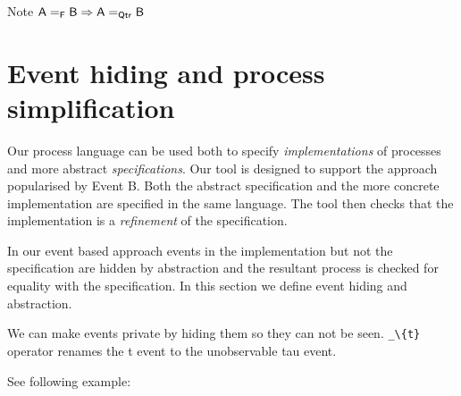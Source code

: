 \documentclass[]{article}
\begin{document}
Note $ \sf A=_F B \Rightarrow A=_{Qtr} B$

\section{Event hiding and process simplification}
Our process language can be used both to specify \emph{implementations}  of  processes and more abstract \emph{specifications}.  Our tool is designed to support the approach popularised by Event B. Both the abstract specification and the more concrete implementation are specified in the same language.  The tool then checks that the implementation is a \emph{refinement} of the specification.

In our event based approach events in the implementation but not the specification are hidden by abstraction and the resultant process is checked for equality with the specification.  In this section we define event hiding and abstraction.



We can make events private  by  hiding them so they can not be seen.  \verb|_\{t}| operator renames the {\sf t} event to the unobservable  {\sf tau} event.

See following example:
\end{document}
